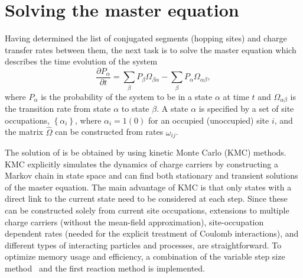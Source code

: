 \chapter{Solving the master equation}
\label{sec:me}

Having determined the list of conjugated segments (hopping sites) and charge transfer rates between them, the next task is to solve the master equation which describes the time evolution of the system
%
\begin{equation}
\label{equ:master}
\frac{\partial P_\alpha}{\partial t} = \sum_{\beta} P_\beta \Omega_{\beta \alpha} - 
\sum_{\beta} P_\alpha \Omega_{\alpha \beta},
\end{equation}
%
where $P_\alpha$ is the probability of the system to be in a state $\alpha$ at time $t$ and $\Omega_{\alpha \beta}$ is the transition rate from state $\alpha$ to state $\beta$. A state $\alpha$ is specified by a set of site occupations, $\left\{ \alpha_i \right\}$, where $\alpha_i = 1 (0)$ for an occupied (unoccupied) site $i$, and the matrix $\hat{\Omega}$ can be constructed from rates $\omega_{ij}$.

The solution of  is be obtained by using kinetic Monte Carlo (KMC) methods. KMC explicitly simulates the dynamics of charge carriers by constructing a Markov chain in state space and can find both stationary and transient solutions of the master equation. The main advantage of KMC is that only states with a direct link to the current state need to be considered at each step. Since these can be constructed solely from current site occupations, extensions to multiple charge carriers (without the mean-field approximation), site-occupation dependent rates (needed for the explicit treatment of Coulomb interactions), and different types of interacting particles and processes, are straightforward. To optimize memory usage and efficiency, a combination of the variable step size method~\cite{bortz_new_1975} and the first reaction method is implemented.